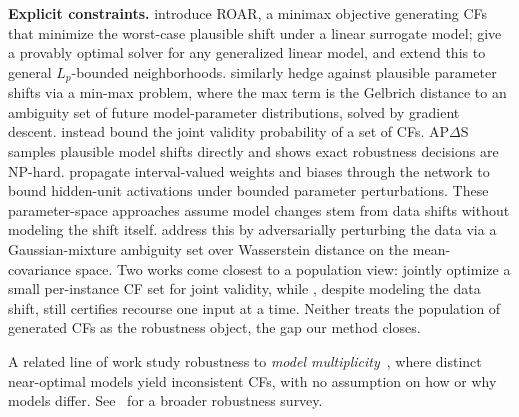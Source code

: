 \textbf{Explicit constraints.}
\citet{upadhyay2021towards} introduce ROAR, %
a minimax objective generating CFs that minimize the worst-case plausible shift under a linear surrogate %
model; \citet{kayastha2024learning} give a provably optimal solver for any generalized linear model, and \citet{kyaw2025optimal} extend this to general $L_p$-bounded neighborhoods. \citet{DBLP:conf/iclr/NguyenBN23} similarly hedge against plausible parameter shifts via a min-max problem, where the max term is the Gelbrich distance to an ambiguity set of future model-parameter distributions, solved by gradient descent. \citet{bui2022counterfactual} instead bound the joint validity probability of a set of CFs. AP$\Delta$S~\cite{Marzari2024Rigorous,marzari2025probabilistically} samples plausible model shifts directly and shows exact robustness decisions are NP-hard. \citet{DBLP:conf/acml/JiangLL0T23,jiang2024interval} propagate interval-valued weights and biases through the network to bound hidden-unit activations under bounded parameter perturbations.
These parameter-space approaches assume model changes stem from data shifts without modeling the shift itself.
\citet{nguyen2022robust} address this by adversarially perturbing the data via a Gaussian-mixture ambiguity set over Wasserstein distance on the mean-covariance space.
Two works come closest to a population view: \citet{bui2022counterfactual} jointly optimize a small per-instance CF set for joint validity, while \citet{nguyen2022robust}, despite modeling the data shift, still certifies recourse one input at a time. Neither treats the population of generated CFs as the robustness object, the gap our method closes.

A related line of work study robustness to \emph{model multiplicity}~\cite{breiman2001statistical,Marx2020Predictive,Black2022Selective,Rudin2019Stop,coston2021characterizing,pawelczyk2020counterfactual,turbal2026ellice}, where distinct near-optimal models yield inconsistent CFs, with no assumption on how or why models differ. See~\cite{ijcai2024p894} for a broader robustness survey.

